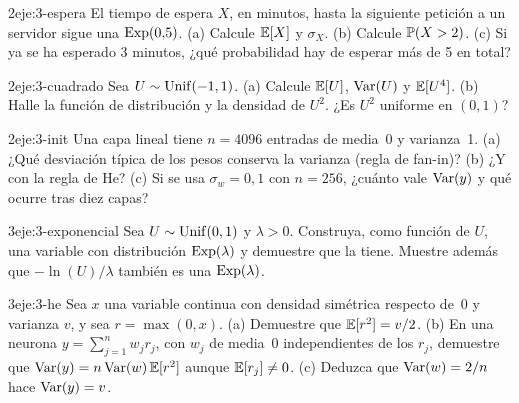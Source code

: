 \begin{ejercicio}{2}{eje:3-espera}
El tiempo de espera $X$, en minutos, hasta la siguiente petición a un servidor sigue una $\operatorname{Exp}(0{,}5)$. (a) Calcule $\mathbb{E}[X]$ y $\sigma_X$. (b) Calcule $\mathbb{P}(X>2)$. (c) Si ya se ha esperado 3 minutos, ¿qué probabilidad hay de esperar más de 5 en total?
\end{ejercicio}

\begin{ejercicio}{2}{eje:3-cuadrado}
Sea $U\sim\operatorname{Unif}(-1,1)$. (a) Calcule $\mathbb{E}[U]$, $\operatorname{Var}(U)$ y $\mathbb{E}[U^{4}]$. (b) Halle la función de distribución y la densidad de $U^{2}$. ¿Es $U^{2}$ uniforme en $(0,1)$?
\end{ejercicio}

\begin{ejercicio}{2}{eje:3-init}
Una capa lineal tiene $n=4096$ entradas de media~0 y varianza~1. (a) ¿Qué desviación típica de los pesos conserva la varianza (regla de fan-in)? (b) ¿Y con la regla de He? (c) Si se usa $\sigma_w=0{,}1$ con $n=256$, ¿cuánto vale $\operatorname{Var}(y)$ y qué ocurre tras diez capas?
\end{ejercicio}

\begin{ejercicio}{3}{eje:3-exponencial}
Sea $U\sim\operatorname{Unif}(0,1)$ y $\lambda>0$. Construya, como función de $U$, una variable con distribución $\operatorname{Exp}(\lambda)$ y demuestre que la tiene. Muestre además que $-\ln(U)/\lambda$ también es una $\operatorname{Exp}(\lambda)$.
\end{ejercicio}

\begin{ejercicio}{3}{eje:3-he}
Sea $x$ una variable continua con densidad simétrica respecto de~0 y varianza $v$, y sea $r=\max(0,x)$. (a) Demuestre que $\mathbb{E}[r^{2}]=v/2$. (b) En una neurona $y=\sum_{j=1}^{n}w_jr_j$, con $w_j$ de media~0 independientes de los $r_j$, demuestre que $\operatorname{Var}(y)=n\operatorname{Var}(w)\,\mathbb{E}[r^{2}]$ aunque $\mathbb{E}[r_j]\ne 0$. (c) Deduzca que $\operatorname{Var}(w)=2/n$ hace $\operatorname{Var}(y)=v$.
\end{ejercicio}

